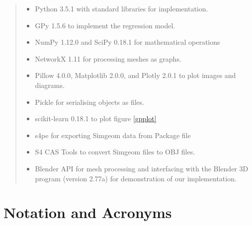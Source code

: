 \documentclass[ %
author={Dillon Keith Diep},
supervisor={Dr. Carl Henrik Ek},
degree={MEng},
title={ART-CG Hair:},
subtitle={Assisted Real-time Content Generation of Stylised Virtual Hair},
type={Research},
year={2017} ]{dissertation}
\begin{document}
\begin{quote}
	\noindent
	\begin{itemize}
		\item Python 3.5.1 with standard libraries for implementation.
		\item GPy 1.5.6 to implement the regression model.
		\item NumPy 1.12.0 and SciPy 0.18.1 for mathematical operations
		\item NetworkX 1.11 for processing meshes as graphs.
		\item Pillow 4.0.0, Matplotlib 2.0.0, and Plotly 2.0.1 to plot images and diagrams.
		\item Pickle for serialising objects as files.
		\item scikit-learn 0.18.1 to plot figure \ref{gpplot}
		\item s4pe for exporting Simgeom data from Package file
		\item S4 CAS Tools to convert Simgeom files to OBJ files.
		\item Blender API for mesh processing and interfacing with the Blender 3D program (version 2.77a) for demonstration of our implementation.
	\end{itemize}
\end{quote}


\chapter*{Notation and Acronyms}
\end{document}
